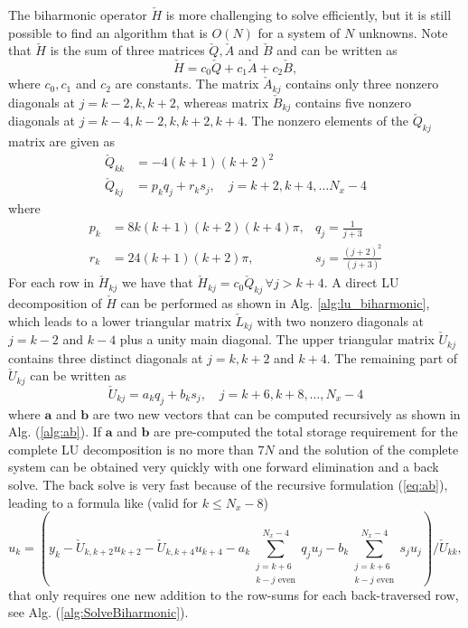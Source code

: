 \documentclass[11pt, oneside]{article}
\newcommand{\N}[1]{\check{#1}}
\begin{document}
The biharmonic operator $\N{H}$ is more challenging to solve efficiently, but 
it is still possible to find an algorithm that is $O(N)$ for a system of $N$ 
unknowns. Note 
that $\N{H}$ is the sum of three matrices $\N{Q}, \N{A}$ and $\N{B}$ and can be 
written as
\begin{equation}
\N{H} = c_0\N{Q} + c_1\N{A} + c_2 \N{B},
\end{equation}
where $c_0, c_1$ and $c_2$ are constants. The matrix $\N{A}_{kj}$ contains only 
three nonzero diagonals at $ j = k-2, k, k+2$,  whereas matrix $\N{B}_{kj}$ 
contains five 
nonzero diagonals at $ j = k-4, k-2, k, k+2, k+4$. The nonzero elements of the 
$\N{Q}_{kj}$ matrix are given as
\begin{align}
 \N{Q}_{kk} &= -4(k+1)(k+2)^2 \\
 \N{Q}_{kj} &= p_kq_j + r_ks_j, \quad j = k+2, k+4, \ldots N_x-4
\end{align}
where 
\begin{align}
p_k &= 8 k (k+1)(k+2)(k+4)\pi, &q_j = \frac{1}{j+3} \label{eq:pk} \\
r_k &= 24(k+1)(k+2)\pi, &s_j =  \frac{(j+2)^2}{(j+3)} \label{eq:rk}
\end{align} 
For each row in $\N{H}_{kj}$ we have that $\N{H}_{kj}=c_0\N{Q}_{kj}\, \forall j 
> k+4$. A direct LU decomposition of $\N{H}$ can be performed as shown in Alg. 
\ref{alg:lu_biharmonic}, which leads to a lower triangular 
matrix $\N{L}_{kj}$ with two nonzero diagonals at $j=k-2$ and $k-4$ plus a 
unity 
main diagonal. The upper triangular matrix $\N{U}_{kj}$ contains three distinct 
diagonals at $j=k, k+2$ and $k+4$. The remaining part of $\N{U}_{kj}$ can be 
written as
\begin{equation}
\N{U}_{kj} = a_k q_j + b_k s_j, \quad j = k+6, k+8, \ldots, N_x-4 \label{eq:ab}
\end{equation}
where $\bm{a}$ and $\bm{b}$ are two new vectors that can be computed 
recursively as shown in Alg. (\ref{alg:ab}). If $\bm{a}$ and $\bm{b}$ are 
pre-computed 
the total storage requirement for the complete LU decomposition is no more than 
$7N$ and the solution of the complete system can be obtained very quickly with 
one forward elimination and a back solve. The back 
solve is very fast because of the recursive formulation (\ref{eq:ab}), leading 
to a formula like (valid for $k \le N_x-8$)
\begin{equation}
u_k = \left(y_k - \N{U}_{k, k+2} u_{k+2} - \N{U}_{k, k+4} u_{k+4} - 
a_k\sum_{\substack{j=k+6\\k-j \text{ even}}}^{N_x-4} q_j u_j - 
b_k\sum_{\substack{j=k+6\\k-j \text{ even}}}^{N_x-4} 
s_j u_j\right)/\N{U}_{kk},
\end{equation}
that only requires 
one new addition to the row-sums for each back-traversed
row, see Alg. (\ref{alg:SolveBiharmonic}).
\end{document}
